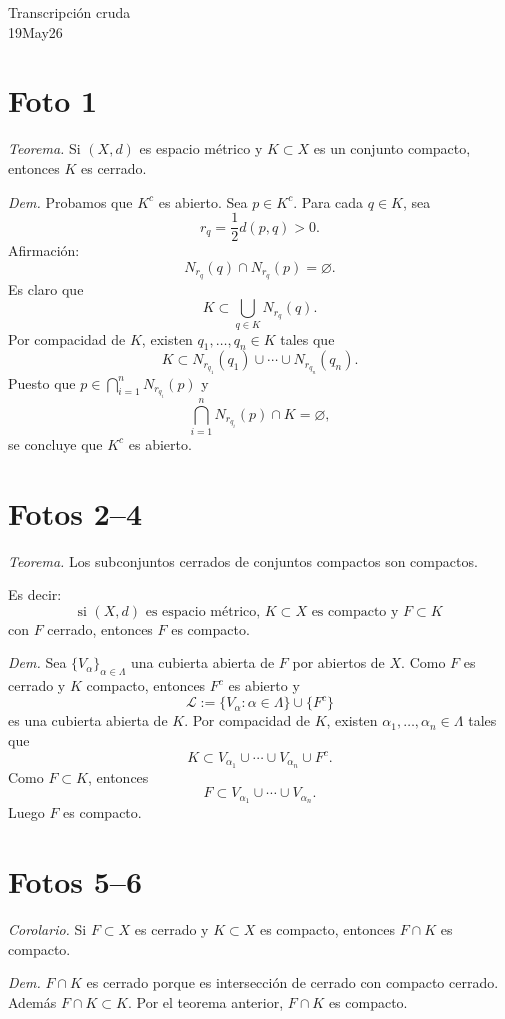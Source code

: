 \documentclass[12pt]{article}
\begin{document}
\begin{center}
{\Large Transcripción cruda}\\[2mm]
{\large 19May26}
\end{center}

\section*{Foto 1}

\textit{Teorema.} Si $(X,d)$ es espacio métrico y $K\subset X$ es un conjunto compacto, entonces $K$ es cerrado.

\textit{Dem.} Probamos que $K^c$ es abierto.
Sea $p\in K^c$.
Para cada $q\in K$, sea
\[
r_q=\frac12 d(p,q)>0.
\]
Afirmación:
\[
N_{r_q}(q)\cap N_{r_q}(p)=\varnothing.
\]
Es claro que
\[
K\subset\bigcup_{q\in K}N_{r_q}(q).
\]
Por compacidad de $K$, existen $q_1,\dots,q_n\in K$ tales que
\[
K\subset N_{r_{q_1}}(q_1)\cup\cdots\cup N_{r_{q_n}}(q_n).
\]
Puesto que $p\in\bigcap_{i=1}^n N_{r_{q_i}}(p)$ y
\[
\bigcap_{i=1}^n N_{r_{q_i}}(p)\cap K=\varnothing,
\]
se concluye que $K^c$ es abierto.

\section*{Fotos 2--4}

\textit{Teorema.} Los subconjuntos cerrados de conjuntos compactos son compactos.

Es decir:
\[
\text{si }(X,d)\text{ es espacio métrico, }K\subset X\text{ es compacto y }F\subset K
\]
con $F$ cerrado, entonces $F$ es compacto.

\textit{Dem.} Sea $\{V_\alpha\}_{\alpha\in\Lambda}$ una cubierta abierta de $F$ por abiertos de $X$.
Como $F$ es cerrado y $K$ compacto, entonces $F^c$ es abierto y
\[
\mathcal L:=\{V_\alpha:\alpha\in\Lambda\}\cup\{F^c\}
\]
es una cubierta abierta de $K$.
Por compacidad de $K$, existen $\alpha_1,\dots,\alpha_n\in\Lambda$ tales que
\[
K\subset V_{\alpha_1}\cup\cdots\cup V_{\alpha_n}\cup F^c.
\]
Como $F\subset K$, entonces
\[
F\subset V_{\alpha_1}\cup\cdots\cup V_{\alpha_n}.
\]
Luego $F$ es compacto.

\section*{Fotos 5--6}

\textit{Corolario.} Si $F\subset X$ es cerrado y $K\subset X$ es compacto, entonces $F\cap K$ es compacto.

\textit{Dem.} $F\cap K$ es cerrado porque es intersección de cerrado con compacto cerrado.
Además $F\cap K\subset K$.
Por el teorema anterior, $F\cap K$ es compacto.
\end{document}
